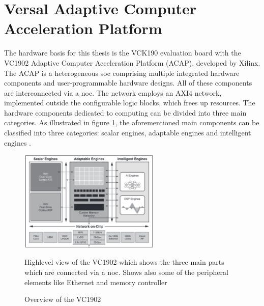 \section{Versal Adaptive Computer Acceleration Platform}\label{sec:versal}
The hardware basis for this thesis is the VCK190 evaluation board with the VC1902 Adaptive Computer 
Acceleration Platform (ACAP), developed by Xilinx. The ACAP is a heterogeneous \ac{soc}
comprising multiple integrated hardware components and user-programmable hardware designs. All of these 
components are interconnected via a \ac{noc}. The network employs an AXI4 network, 
implemented outside the configurable logic blocks, which frees up resources. The hardware components 
dedicated to computing can be divided into three main categories. As illustrated in figure 
\ref{fig:high_scheme}, the aforementioned main components can be classified into three categories: 
scalar engines, adaptable engines and intelligent engines \cite{AMD_a_aie}.\par

\begin{figure}[h]
    \centering
    \includegraphics[width=0.6\textwidth]{images/high_level_vc1902.png} %
    \captionsetup{justification=centering}
    \caption{Overview of the VC1902 \cite{AMD_a_aie}}
            Highlevel view of the VC1902 which shows the three main parts which are connected via a \ac{noc}. Shows also some of the peripheral elements like Ethernet and memory controller
    \label{fig:high_scheme}
\end{figure}

